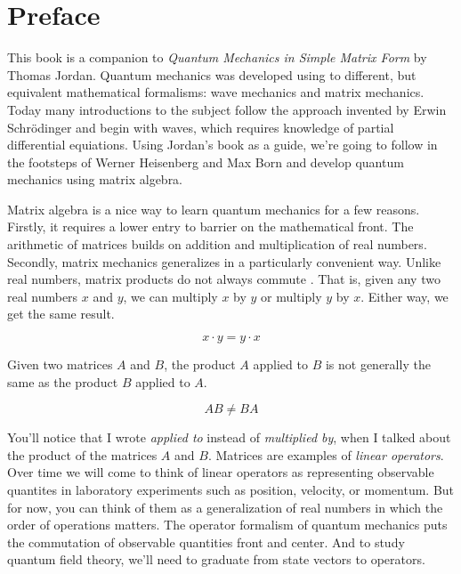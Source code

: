 \chapter{Preface}

This book is a companion to \emph{Quantum Mechanics in Simple Matrix Form} \cite{Jordan2005} by Thomas Jordan. Quantum mechanics was developed using to different, but equivalent mathematical formalisms: wave mechanics and matrix mechanics. Today many introductions to the subject follow the approach invented by Erwin Schr\"odinger and begin with waves, which requires knowledge of partial differential equiations. Using Jordan's book as a guide, we're going to follow in the footsteps of Werner Heisenberg and Max Born and develop quantum mechanics using matrix algebra.

Matrix algebra is a nice way to learn quantum mechanics for a few reasons. Firstly, it requires a lower entry to barrier on the mathematical front. The arithmetic of matrices builds on addition and multiplication of real numbers. Secondly, matrix mechanics generalizes in a particularly convenient way. Unlike real numbers, matrix products do not always commute . That is, given any two real numbers $x$ and $y$, we can multiply $x$ by $y$ or multiply $y$ by $x$. Either way, we get the same result.

$$ x\cdot y = y \cdot x $$

Given two matrices $A$ and $B$, the product $A$ applied to $B$ is not generally the same as the product $B$ applied to $A$.

$$ AB \neq BA $$

You'll notice that I wrote \emph{applied to} instead of \emph{multiplied by}, when I talked about the product of the matrices $A$ and $B$. Matrices are examples of \emph{linear operators}. Over time we will come to think of linear operators as representing observable quantites in laboratory experiments such as position, velocity, or momentum. But for now, you can think of them as a generalization of real numbers in which the order of operations matters. The operator formalism of quantum mechanics puts the commutation of observable quantities front and center. And to study quantum field theory, we'll need to graduate from state vectors to operators.

